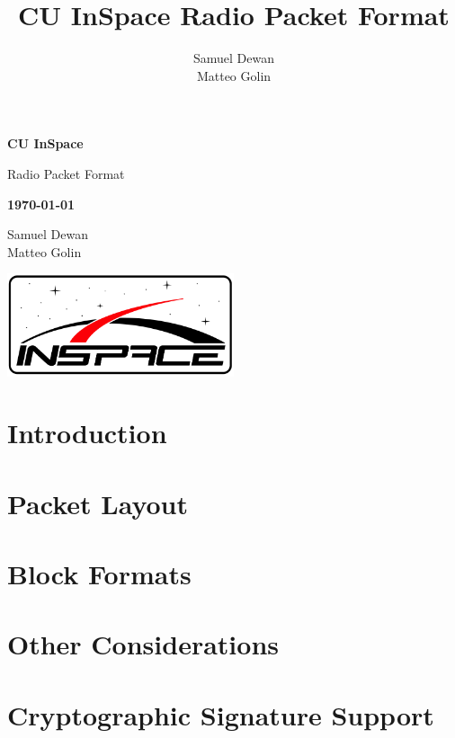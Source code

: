 \documentclass[11pt,letterpaper]{article}
\title{CU InSpace Radio Packet Format}
\author{Samuel Dewan\\Matteo Golin}
\begin{document}
\frenchspacing

\begin{titlepage}
	\centering

	{\large \textbf{CU InSpace}}

	{\Huge \sffamily Radio Packet Format}

	{\large \textbf{\today}}

	Samuel Dewan \\
	Matteo Golin

	\includegraphics[width=0.5\textwidth]{logo.png}

\end{titlepage}

\tableofcontents
\clearpage
{}

\section{Introduction}
\label{sec:introduction}

\clearpage

\section{Packet Layout}
\label{sec:packet-layout}

\clearpage

\section{Block Formats}
\label{sec:block-formats}

\clearpage

\section{Other Considerations}
\label{sec:other-considerations}

\clearpage

\section{Cryptographic Signature Support}
\label{sec:signatures}

\end{document}
